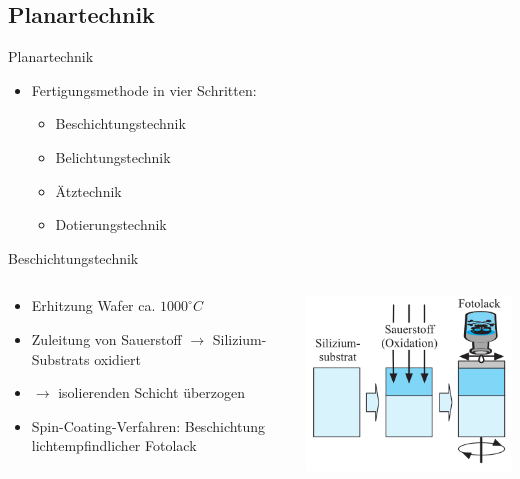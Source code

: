 \documentclass[12pt%
,aspectratio=169%
]{beamer}
\begin{document}
\subsection{Planartechnik}
\begin{frame}{Planartechnik}
\begin{itemize}
	\item Fertigungsmethode in vier Schritten:
	\begin{itemize}
		\item Beschichtungstechnik
		\item Belichtungstechnik
		\item Ätztechnik
		\item Dotierungstechnik
	\end{itemize}
\end{itemize}
\end{frame}

\begin{frame}{Beschichtungstechnik}
\begin{columns}[T] %
\begin{column}{.58\textwidth}
\begin{itemize}
	\item Erhitzung Wafer ca. $1000^\circ C$
	\item Zuleitung von Sauerstoff $\to$ Silizium-Substrats oxidiert
	\item $\to$ isolierenden Schicht überzogen
	\item Spin-Coating-Verfahren: Beschichtung lichtempﬁndlicher Fotolack
\end{itemize}
\end{column}%
\hfill%
\begin{column}{.38\textwidth}
\centering
\vspace*{-1cm}
\includegraphics[scale=0.5]{pictures/beschichtung}
\end{column}%
\end{columns}
\end{frame}
\end{document}
